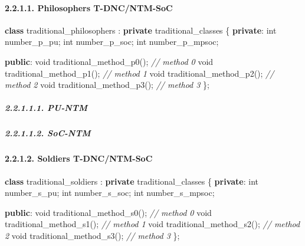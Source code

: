 \documentclass[
]{article}
\newenvironment{Shaded}{}{}
\newcommand{\CommentTok}[1]{\textcolor[rgb]{0.38,0.63,0.69}{\textit{#1}}}
\newcommand{\DataTypeTok}[1]{\textcolor[rgb]{0.56,0.13,0.00}{#1}}
\newcommand{\KeywordTok}[1]{\textcolor[rgb]{0.00,0.44,0.13}{\textbf{#1}}}
\newcommand{\NormalTok}[1]{#1}
\begin{document}
\hypertarget{philosophers-t-dncntm-soc}{%
\paragraph{2.2.1.1. Philosophers
T-DNC/NTM-SoC}\label{philosophers-t-dncntm-soc}}

\begin{Shaded}
\begin{Highlighting}[]
\KeywordTok{class}\NormalTok{ traditional\_philosophers : }\KeywordTok{private}\NormalTok{ traditional\_classes \{}
   \KeywordTok{private}\NormalTok{:}
      \DataTypeTok{int}\NormalTok{ number\_p\_pu;}
      \DataTypeTok{int}\NormalTok{ number\_p\_soc;}
      \DataTypeTok{int}\NormalTok{ number\_p\_mpsoc;}

   \KeywordTok{public}\NormalTok{:}
      \DataTypeTok{void}\NormalTok{ traditional\_method\_p0();  }\CommentTok{// method 0}
      \DataTypeTok{void}\NormalTok{ traditional\_method\_p1();  }\CommentTok{// method 1}
      \DataTypeTok{void}\NormalTok{ traditional\_method\_p2();  }\CommentTok{// method 2}
      \DataTypeTok{void}\NormalTok{ traditional\_method\_p3();  }\CommentTok{// method 3}
\NormalTok{\};}
\end{Highlighting}
\end{Shaded}

\hypertarget{pu-ntm-3}{%
\subparagraph{2.2.1.1.1. PU-NTM}\label{pu-ntm-3}}

\hypertarget{soc-ntm-3}{%
\subparagraph{2.2.1.1.2. SoC-NTM}\label{soc-ntm-3}}

\hypertarget{soldiers-t-dncntm-soc}{%
\paragraph{2.2.1.2. Soldiers
T-DNC/NTM-SoC}\label{soldiers-t-dncntm-soc}}

\begin{Shaded}
\begin{Highlighting}[]
\KeywordTok{class}\NormalTok{ traditional\_soldiers : }\KeywordTok{private}\NormalTok{ traditional\_classes \{}
   \KeywordTok{private}\NormalTok{:}
      \DataTypeTok{int}\NormalTok{ number\_s\_pu;}
      \DataTypeTok{int}\NormalTok{ number\_s\_soc;}
      \DataTypeTok{int}\NormalTok{ number\_s\_mpsoc;}

   \KeywordTok{public}\NormalTok{:}
      \DataTypeTok{void}\NormalTok{ traditional\_method\_s0();  }\CommentTok{// method 0}
      \DataTypeTok{void}\NormalTok{ traditional\_method\_s1();  }\CommentTok{// method 1}
      \DataTypeTok{void}\NormalTok{ traditional\_method\_s2();  }\CommentTok{// method 2}
      \DataTypeTok{void}\NormalTok{ traditional\_method\_s3();  }\CommentTok{// method 3}
\NormalTok{\};}
\end{Highlighting}
\end{Shaded}
\end{document}
